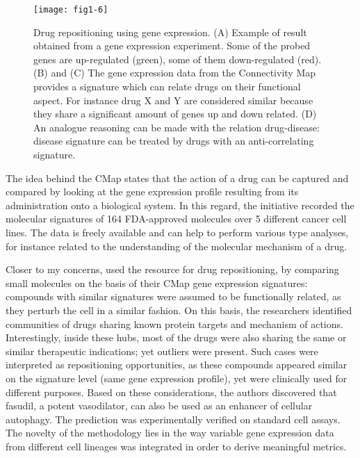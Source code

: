 \begin{figure}[ht]
    \centering
    \texttt{[image: fig1-6]}
    \caption{Drug repositioning using gene expression. (A) Example of result obtained from a gene expression experiment. Some of the probed genes are up-regulated (green), some of them down-regulated (red). (B) and (C) The gene expression data from the Connectivity Map provides a signature which can relate drugs on their functional aspect. For instance drug X and Y are considered similar because they share a significant amount of genes up and down related. (D) An analogue reasoning can be made with the relation drug-disease: disease signature can be treated by drugs with an anti-correlating signature.}
    \label{fig1-6}
\end{figure}

The idea behind the CMap states that the action of a drug can be captured and compared by looking at the gene expression profile resulting from its administration onto a biological system. In this regard, the initiative recorded the molecular signatures of 164 FDA-approved molecules over 5 different cancer cell lines. The data is freely available and can help to perform various type analyses, for instance related to the understanding of the molecular mechanism of a drug.

Closer to my concerns, \cite{iorio2010discovery} used the resource for drug repositioning, by comparing small molecules on the basis of their CMap gene expression signatures: compounds with similar signatures were assumed to be functionally related, as they perturb the cell in a similar fashion. On this basis, the researchers identified communities of drugs sharing known protein targets and mechanism of actions. Interestingly, inside these hubs, most of the drugs were also sharing the same or similar therapeutic indications; yet outliers were present. Such cases were interpreted as repositioning opportunities, as these compounds appeared similar on the signature level (same gene expression profile), yet were clinically used for different purposes. Based on these considerations, the authors discovered that fasudil, a potent vasodilator, can also be used as an enhancer of cellular autophagy. The prediction was experimentally verified on standard cell assays. The novelty of the methodology lies in the way variable gene expression data from different cell lineages was integrated in order to derive meaningful metrics.

